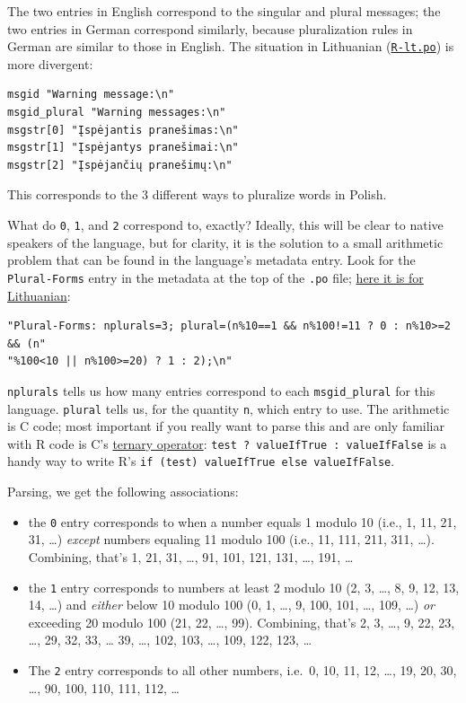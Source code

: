 \documentclass[
]{book}
\providecommand{\tightlist}{%
  \setlength{\itemsep}{0pt}\setlength{\parskip}{0pt}}
\begin{document}
The two entries in English correspond to the singular and plural
messages; the two entries in German correspond similarly, because
pluralization rules in German are similar to those in English. The
situation in Lithuanian
(\href{https://github.com/r-devel/r-svn/blob/c715d61cb74b3fee2d035faed9b258e86e420b75/src/library/base/po/R-lt.po\#L1999-L2003}{\texttt{R-lt.po}})
is more divergent:

\begin{verbatim}
msgid "Warning message:\n"
msgid_plural "Warning messages:\n"
msgstr[0] "Įspėjantis pranešimas:\n"
msgstr[1] "Įspėjantys pranešimai:\n"
msgstr[2] "Įspėjančių pranešimų:\n"
\end{verbatim}

This corresponds to the 3 different ways to pluralize words in Polish.

What do \texttt{0}, \texttt{1}, and \texttt{2} correspond to, exactly? Ideally, this will be
clear to native speakers of the language, but for clarity, it is the
solution to a small arithmetic problem that can be found in the
language's metadata entry. Look for the \texttt{Plural-Forms} entry in the
metadata at the top of the \texttt{.po} file; \href{https://github.com/r-devel/r-svn/blob/c715d61cb74b3fee2d035faed9b258e86e420b75/src/library/base/po/R-lt.po\#L18-L19}{here it is for
Lithuanian}:

\begin{verbatim}
"Plural-Forms: nplurals=3; plural=(n%10==1 && n%100!=11 ? 0 : n%10>=2 && (n"
"%100<10 || n%100>=20) ? 1 : 2);\n"
\end{verbatim}

\texttt{nplurals} tells us how many entries correspond to each \texttt{msgid\_plural}
for this language. \texttt{plural} tells us, for the quantity \texttt{n}, which entry
to use. The arithmetic is C code; most important if you really want to
parse this and are only familiar with R code is C's \href{https://en.wikipedia.org/wiki/\%3F:}{ternary
operator}:
\texttt{test\ ?\ valueIfTrue\ :\ valueIfFalse} is a handy way to write R's
\texttt{if\ (test)\ valueIfTrue\ else\ valueIfFalse}.

Parsing, we get the following associations:

\begin{itemize}
\tightlist
\item
  the \texttt{0} entry corresponds to when a number equals 1 modulo 10 (i.e.,
  1, 11, 21, 31, \ldots) \emph{except} numbers equaling 11 modulo 100 (i.e.,
  11, 111, 211, 311, \ldots). Combining, that's 1, 21, 31, \ldots, 91, 101,
  121, 131, \ldots, 191, \ldots{}
\item
  the \texttt{1} entry corresponds to numbers at least 2 modulo 10 (2, 3,
  \ldots, 8, 9, 12, 13, 14, \ldots) and \emph{either} below 10 modulo 100 (0, 1,
  \ldots, 9, 100, 101, \ldots, 109, \ldots) \emph{or} exceeding 20 modulo 100 (21,
  22, \ldots, 99). Combining, that's 2, 3, \ldots, 9, 22, 23, \ldots, 29, 32,
  33, \ldots{} 39, \ldots, 102, 103, \ldots, 109, 122, 123, \ldots{}
\item
  The \texttt{2} entry corresponds to all other numbers, i.e.~0, 10, 11, 12,
  \ldots, 19, 20, 30, \ldots, 90, 100, 110, 111, 112, \ldots{}
\end{itemize}
\end{document}
